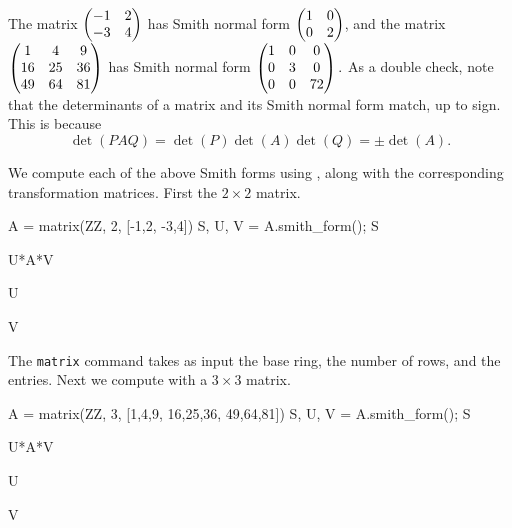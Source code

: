 \begin{example}
The matrix $\left( \begin{matrix}-1&2\\-3&4 \end{matrix}\right)$ has Smith normal form
$\left( \begin{matrix}1&0\\0&2 \end{matrix}\right)$,
and the matrix 
$\left( \begin{matrix}1&4&9\\16&25&36\\49&64&81 \end{matrix}\right)$
has Smith normal form
$\left( \begin{matrix}1&0&0\\0&3&0\\0&0&72 \end{matrix}\right).$
As a double check, note that the determinants of a matrix and its Smith
normal form match, up to sign. This is because
$$\det(PAQ) = \det(P)\det(A)\det(Q) = \pm \det(A).$$

We compute each of the above Smith forms using \sage,
along with the corresponding transformation matrices.
First the $2\times 2$ matrix.
\begin{sagecode}
\begin{sagecell}
A = matrix(ZZ, 2, [-1,2, -3,4])
S, U, V = A.smith_form(); S
\end{sagecell}
\begin{sageout}
[1 0]
[0 2]
\end{sageout}
\begin{sagecell}
U*A*V
\end{sagecell}
\begin{sageout}
[1 0]
[0 2]
\end{sageout}
\begin{sagecell}
U
\end{sagecell}
\begin{sageout}
[ 0  1]
[ 1 -1]
\end{sageout}
\begin{sagecell}
V
\end{sagecell}
\begin{sageout}
[1 4]
[1 3]
\end{sageout}
\end{sagecode}
The \sage{} {\tt matrix} command takes as input the base ring, the number
of rows, and the entries.  Next we compute with a $3\times3$ matrix.
\begin{sagecode}
\begin{sagecell}
A = matrix(ZZ, 3, [1,4,9,  16,25,36, 49,64,81])
S, U, V = A.smith_form(); S
\end{sagecell}
\begin{sageout}
[ 1  0  0]
[ 0  3  0]
[ 0  0 72]
\end{sageout}
\begin{sagecell}
U*A*V
\end{sagecell}
\begin{sageout}
[ 1  0  0]
[ 0  3  0]
[ 0  0 72]
\end{sageout}
\begin{sagecell}
U
\end{sagecell}
\begin{sageout}
[  0   0   1]
[  0   1  -1]
[  1 -20 -17]
\end{sageout}
\begin{sagecell}
V
\end{sagecell}
\begin{sageout}
[  47   74   93]
[ -79 -125 -156]
[  34   54   67]
\end{sageout}
\end{sagecode}


\end{example}
